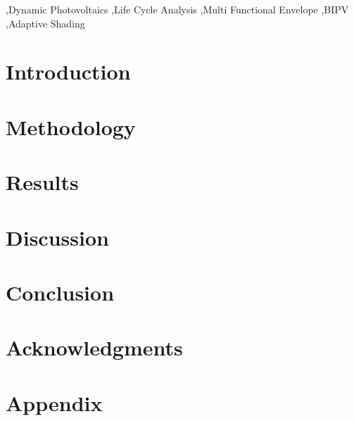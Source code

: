 \documentclass[preprint,12pt]{elsarticle} %
\begin{document}
\begin{frontmatter}
\begin{abstract}
\end{abstract}

\begin{keyword}
\sep Dynamic Photovoltaics \sep Life Cycle Analysis \sep Multi Functional Envelope \sep BIPV \sep Adaptive Shading
\end{keyword}

\end{frontmatter}

\section{Introduction}
\label{ch:introduction}


\section{Methodology}
\label{ch:method}


\section{Results}
\label{ch:results}



\section{Discussion}
\label{ch:discussion}


\section{Conclusion}
\label{ch:conclusion}


\section{Acknowledgments}
\label{ch:acknowledgments}


\section{Appendix}
\label{ch:appendix}



   
  
\end{document}
